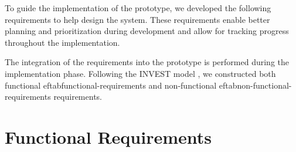 To guide the implementation of the prototype, we developed the following requirements to help design the system. These requirements enable better planning and prioritization during development and allow for tracking progress throughout the implementation.

The integration of the requirements into the prototype is performed during the implementation phase. Following the INVEST model \cite{10.5555/984017}, we constructed both functional
ef{tab\:functional-requirements} and non-functional
ef{tab\:non-functional-requirements} requirements.

\section{Functional Requirements}

\renewcommand{\arraystretch}{1.5} %
